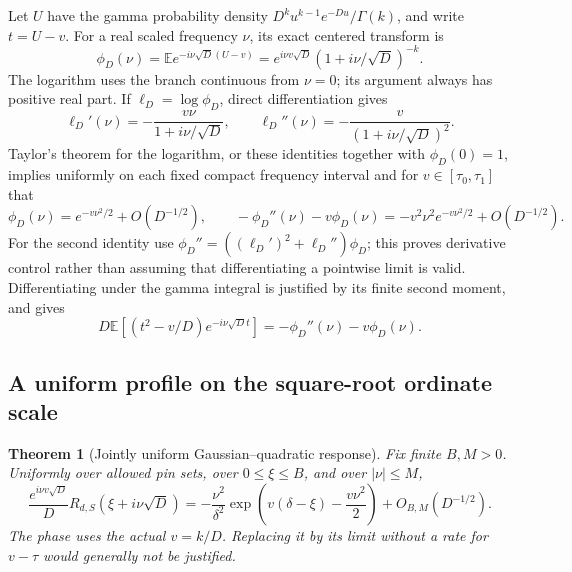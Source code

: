 \documentclass[11pt]{article}
\newtheorem{theorem}{Theorem}[section]
\theoremstyle{definition}
\theoremstyle{remark}
\begin{document}
Let \(U\) have the gamma probability density
\(D^ku^{k-1}e^{-Du}/\Gamma(k)\), and write \(t=U-v\).
For a real scaled frequency \(\nu\), its exact centered transform is
\begin{equation}
 \phi_D(\nu)=\mathbb E e^{-i\nu\sqrt D(U-v)}
 =e^{i\nu v\sqrt D}(1+i\nu/\sqrt D)^{-k}.
 \label{eq:f2v94-gamma-transform}
\end{equation}
The logarithm uses the branch continuous from \(\nu=0\); its
argument always has positive real part.  If \(\ell_D=\log\phi_D\),
direct differentiation gives
\begin{equation}
 \ell_D'(\nu)=-\frac{v\nu}{1+i\nu/\sqrt D},\qquad
 \ell_D''(\nu)=-\frac{v}{(1+i\nu/\sqrt D)^2}.
 \label{eq:f2v94-log-derivatives}
\end{equation}
Taylor's theorem for the logarithm, or these identities together with
\(\phi_D(0)=1\), implies uniformly on each fixed compact frequency
interval and for \(v\in[\tau_0,\tau_1]\) that
\begin{equation}
 \phi_D(\nu)=e^{-v\nu^2/2}+O(D^{-1/2}),\qquad
 -\phi_D''(\nu)-v\phi_D(\nu)
 =-v^2\nu^2e^{-v\nu^2/2}+O(D^{-1/2}).
 \label{eq:f2v94-Hermite-transform}
\end{equation}
For the second identity use
\(\phi_D''=((\ell_D')^2+\ell_D'')\phi_D\); this proves
derivative control rather than assuming that differentiating a
pointwise limit is valid.  Differentiating under the gamma integral
is justified by its finite second moment, and gives
\begin{equation}
 D\mathbb E\left[(t^2-v/D)e^{-i\nu\sqrt D t}\right]
 =-\phi_D''(\nu)-v\phi_D(\nu).
 \label{eq:f2v94-centered-quadratic}
\end{equation}

\subsection{A uniform profile on the square-root ordinate scale}

\begin{theorem}[Jointly uniform Gaussian--quadratic response]
\label{thm:f2v94-profile}
Fix finite \(B,M>0\).  Uniformly over allowed pin sets, over
\(0\le\xi\le B\), and over \(|\nu|\le M\),
\begin{equation}
 \frac{e^{i\nu v\sqrt D}}{D}
 R_{d,S}(\xi+i\nu\sqrt D)
 =-\frac{\nu^2}{\delta^2}
      \exp\left(v(\delta-\xi)-\frac{v\nu^2}{2}\right)
       +O_{B,M}(D^{-1/2}).
 \label{eq:f2v94-profile}
\end{equation}
The phase uses the actual \(v=k/D\).  Replacing it by its limit
without a rate for \(v-\tau\) would generally not be justified.
\end{theorem}
\end{document}
